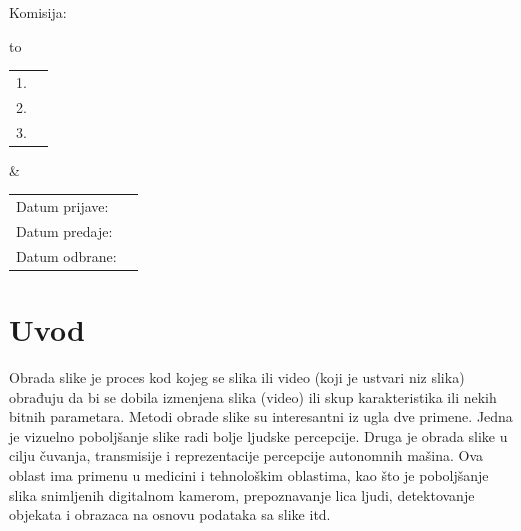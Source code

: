 \documentclass[a4paper,12pt,titlepage]{article}
\begin{document}
   \noindent
    Komisija:
    
    \vspace{0.1cm}
    
    \noindent
    \begin{tabu} to   
         \begin{tabular}{@{}ll}
            1. & \underline{\hspace{6.5cm}}\\
            2. & \underline{\hspace{6.5cm}}\\
            3. & \underline{\hspace{6.5cm}}
        \end{tabular}  
        
    &
   
        \begin{tabular}{ll@{}}
            Datum prijave: & \underline{\hspace{3cm}}\\
            Datum predaje: & \underline{\hspace{3cm}}\\
            Datum odbrane: & \underline{\hspace{3cm}}
        \end{tabular}
  
    \end{tabu}
    
    \thispagestyle{empty}
    \newpage


\tableofcontents

\setlength{\parskip}{\baselineskip}%
\setlength{\parindent}{15pt}%

\thispagestyle{empty}
\newpage


\section{Uvod}%

Obrada slike je proces kod kojeg se slika ili video (koji je ustvari niz slika) obrađuju da bi se dobila izmenjena slika (video) ili skup karakteristika ili nekih bitnih parametara. Metodi obrade slike su interesantni iz ugla dve primene. Jedna je vizuelno poboljšanje slike radi bolje ljudske percepcije. Druga je obrada slike u cilju čuvanja, transmisije i reprezentacije percepcije autonomnih mašina. Ova oblast ima primenu u medicini i tehnološkim oblastima, kao što je poboljšanje slika snimljenih digitalnom kamerom, prepoznavanje lica ljudi, detektovanje objekata i obrazaca na osnovu podataka sa slike itd. 
\end{document}
